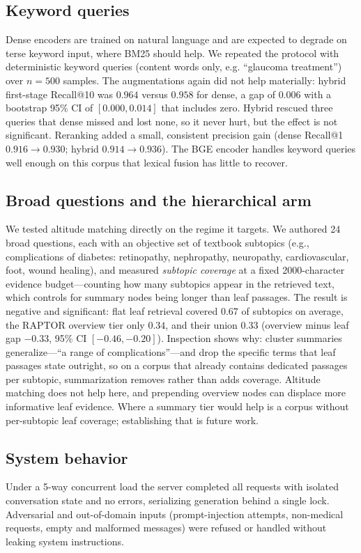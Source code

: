 \documentclass[conference]{IEEEtran}
\begin{document}
\subsection{Keyword queries}
Dense encoders are trained on natural language and are expected to degrade on
terse keyword input, where BM25 should help. We repeated the protocol with
deterministic keyword queries (content words only, e.g. ``glaucoma treatment'')
over $n{=}500$ samples. The augmentations again did not help materially: hybrid
first-stage Recall@10 was $0.964$ versus $0.958$ for dense, a gap of $0.006$ with
a bootstrap 95\% CI of $[0.000, 0.014]$ that includes zero. Hybrid rescued three
queries that dense missed and lost none, so it never hurt, but the effect is not
significant. Reranking added a small, consistent precision gain (dense Recall@1
$0.916\rightarrow0.930$; hybrid $0.914\rightarrow0.936$). The BGE encoder handles
keyword queries well enough on this corpus that lexical fusion has little to
recover.

\subsection{Broad questions and the hierarchical arm}
We tested altitude matching directly on the regime it targets. We authored 24
broad questions, each with an objective set of textbook subtopics (e.g.,
complications of diabetes: retinopathy, nephropathy, neuropathy, cardiovascular,
foot, wound healing), and measured \emph{subtopic coverage} at a fixed 2000-character
evidence budget---counting how many subtopics appear in the retrieved text, which
controls for summary nodes being longer than leaf passages. The result is
negative and significant: flat leaf retrieval covered $0.67$ of subtopics on
average, the RAPTOR overview tier only $0.34$, and their union $0.33$ (overview
minus leaf gap $-0.33$, 95\% CI $[-0.46, -0.20]$). Inspection shows why: cluster
summaries generalize---``a range of complications''---and drop the specific terms
that leaf passages state outright, so on a corpus that already contains dedicated
passages per subtopic, summarization removes rather than adds coverage. Altitude
matching does not help here, and prepending overview nodes can displace more
informative leaf evidence. Where a summary tier would help is a corpus without
per-subtopic leaf coverage; establishing that is future work.

\subsection{System behavior}
Under a 5-way concurrent load the server completed all requests with isolated
conversation state and no errors, serializing generation behind a single lock.
Adversarial and out-of-domain inputs (prompt-injection attempts, non-medical
requests, empty and malformed messages) were refused or handled without leaking
system instructions.
\end{document}
